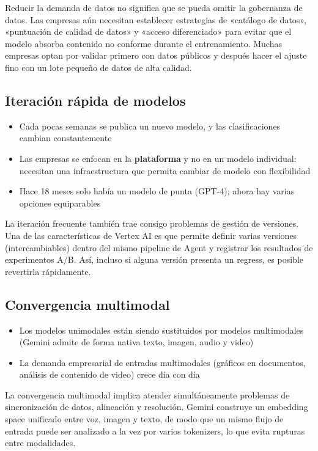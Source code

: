 \documentclass[a4paper]{article}
\begin{document}
Reducir la demanda de datos no significa que se pueda omitir la gobernanza de datos. Las empresas aún necesitan establecer estrategias de «catálogo de datos», «puntuación de calidad de datos» y «acceso diferenciado» para evitar que el modelo absorba contenido no conforme durante el entrenamiento. Muchas empresas optan por validar primero con datos públicos y después hacer el ajuste fino con un lote pequeño de datos de alta calidad.

\subsection{Iteración rápida de modelos}

\begin{itemize}
    \item Cada pocas semanas se publica un nuevo modelo, y las clasificaciones cambian constantemente
    \item Las empresas se enfocan en la \textbf{plataforma} y no en un modelo individual: necesitan una infraestructura que permita cambiar de modelo con flexibilidad
    \item Hace 18 meses solo había un modelo de punta (GPT-4); ahora hay varias opciones equiparables
\end{itemize}

La iteración frecuente también trae consigo problemas de gestión de versiones. Una de las características de Vertex AI es que permite definir varias versiones (intercambiables) dentro del mismo pipeline de Agent y registrar los resultados de experimentos A/B. Así, incluso si alguna versión presenta un regress, es posible revertirla rápidamente.

\subsection{Convergencia multimodal}

\begin{itemize}
    \item Los modelos unimodales están siendo sustituidos por modelos multimodales (Gemini admite de forma nativa texto, imagen, audio y video)
    \item La demanda empresarial de entradas multimodales (gráficos en documentos, análisis de contenido de video) crece día con día
\end{itemize}

La convergencia multimodal implica atender simultáneamente problemas de sincronización de datos, alineación y resolución. Gemini construye un embedding space unificado entre voz, imagen y texto, de modo que un mismo flujo de entrada puede ser analizado a la vez por varios tokenizers, lo que evita rupturas entre modalidades.
\end{document}
